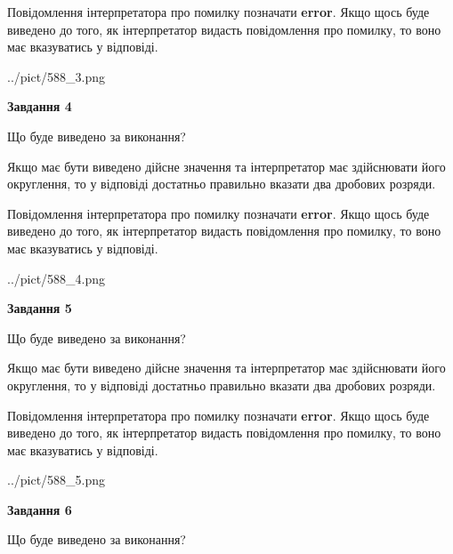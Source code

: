 \documentclass[12pt, ukrainian]{article}
\begin{document}
{\begin {Large}
Повідомлення інтерпретатора про помилку позначати \textbf{error}.
Якщо щось буде виведено до того, як інтерпретатор видасть повідомлення про помилку, 
то воно має вказуватись у відповіді. \par

\begin{center}
	{../pict/588_3.png}
\end{center}
\newpage

{\begin {center}\textbf{Завдання 4}\end {center}}\par
Що буде виведено за виконання? \par

Якщо має бути виведено дійсне значення та інтерпретатор має здійснювати його округлення, 
то у відповіді достатньо правильно вказати два дробових розряди.

Повідомлення інтерпретатора про помилку позначати \textbf{error}.
Якщо щось буде виведено до того, як інтерпретатор видасть повідомлення про помилку, 
то воно має вказуватись у відповіді. \par

\begin{center}
	{../pict/588_4.png}
\end{center}
\newpage

{\begin {center}\textbf{Завдання 5}\end {center}}\par
Що буде виведено за виконання? \par

Якщо має бути виведено дійсне значення та інтерпретатор має здійснювати його округлення, 
то у відповіді достатньо правильно вказати два дробових розряди.

Повідомлення інтерпретатора про помилку позначати \textbf{error}.
Якщо щось буде виведено до того, як інтерпретатор видасть повідомлення про помилку, 
то воно має вказуватись у відповіді. \par

\begin{center}
	{../pict/588_5.png}
\end{center}
\newpage

{\begin {center}\textbf{Завдання 6}\end {center}}\par
Що буде виведено за виконання? \par


\end{Large}}
\end{document}
